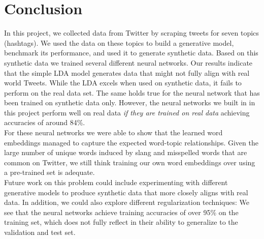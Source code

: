 \documentclass[11pt]{article}
\begin{document}
\section{Conclusion}
In this project, we collected data from Twitter by scraping tweets for seven topics (hashtags). We used the data on these topics to build a generative model, benchmark its performance, and used it to generate synthetic data. Based on this synthetic data we trained several different neural networks. 
Our results indicate that the simple LDA model generates data that might not fully align with real world Tweets. While the LDA excels when used on synthetic data, it fails to perform on the real data set. The same holds true for the neural network that has been trained on synthetic data only. However, the neural networks we built in in this project perform well on real data \emph{if they are trained on real data} achieving accuracies of around 84\%.
\\[5pt]
\noindent For these neural networks we were able to show that the learned word embeddings managed to capture the expected word-topic relationships. Given the large number of unique words induced by slang and misspelled words that are common on Twitter, we still think training our own word embeddings over using a pre-trained set is adequate.
\\[5pt]
\noindent Future work on this problem could include experimenting with different generative models to produce synthetic data that more closely aligns with real data. In addition, we could also explore different regularization techniques: We see that the neural networks achieve training accuracies of over 95\% on the training set, which does not fully reflect in their ability to generalize to the validation and test set. 

\newpage
\printbibliography
\end{document}
